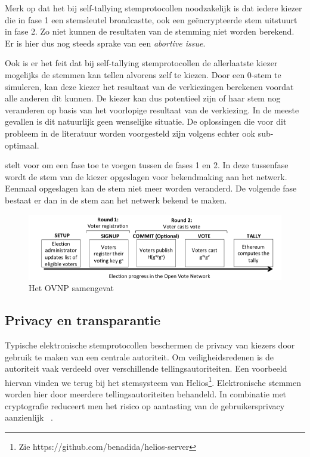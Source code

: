 			Merk op dat het bij self-tallying stemprotocollen noodzakelijk is dat iedere kiezer die in fase 1 een stemsleutel broadcastte, ook een geëncrypteerde stem uitstuurt in fase 2. Zo niet kunnen de resultaten van de stemming niet worden berekend. Er is hier dus nog steeds sprake van een \textit{abortive issue}.
			
			Ook is er het feit dat bij self-tallying stemprotocollen de allerlaatste kiezer mogelijks de stemmen kan tellen alvorens zelf te kiezen. Door een 0-stem te simuleren, kan deze kiezer het resultaat van de verkiezingen berekenen voordat alle anderen dit kunnen. De kiezer kan dus potentieel zijn of haar stem nog veranderen op basis van het voorlopige resultaat van de verkiezing. In de meeste gevallen is dit natuurlijk geen wenselijke situatie. De oplossingen die voor dit probleem in de literatuur worden voorgesteld zijn volgens \textcite{McCorry2017} echter ook sub-optimaal. 
			
			\textcite{McCorry2017} stelt voor om een fase toe te voegen tussen de fases 1 en 2. In deze tussenfase wordt de stem van de kiezer opgeslagen voor bekendmaking aan het netwerk. Eenmaal opgeslagen kan de stem niet meer worden veranderd. De volgende fase bestaat er dan in de stem aan het netwerk bekend te maken. 

			\begin{figure}
				\includegraphics[width=\linewidth]{img/ovnp.png}
				\caption{Het OVNP samengevat~\autocite{McCorry2017}}
				\label{fig:ovnp}
			\end{figure} 
	
	\newpage
	\subsection{Privacy en transparantie}
		Typische elektronische stemprotocollen beschermen de privacy van kiezers door gebruik te maken van een centrale autoriteit. Om veiligheidsredenen is de autoriteit vaak verdeeld over verschillende tellingsautoriteiten. Een voorbeeld hiervan vinden we terug bij het stemsysteem van Helios\footnote{Zie https://github.com/benadida/helios-server}. Elektronische stemmen worden hier door meerdere tellingsautoriteiten behandeld. In combinatie met cryptografie reduceert men het risico op aantasting van de gebruikersprivacy aanzienlijk ~\autocite{Adida2008}. 
	
